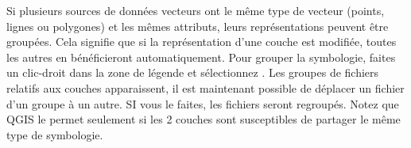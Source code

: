

Si plusieurs sources de donn\'ees vecteurs ont le m\^eme type de vecteur (points, lignes ou polygones) et les m\^emes attributs, leurs repr\'esentations peuvent \^etre group\'ees. Cela signifie que si la repr\'esentation d'une couche est modifi\'ee, toutes les autres en b\'en\'eficieront automatiquement. Pour grouper la symbologie, faites un clic-droit dans la zone de l\'egende et s\'electionnez . Les groupes de fichiers relatifs aux couches apparaissent, il est maintenant possible de d\'eplacer un fichier d'un groupe \`a un autre. SI vous le faites, les fichiers seront regroup\'es. Notez que QGIS le permet seulement si les 2 couches sont susceptibles de partager le m\^eme type de symbologie.


%

